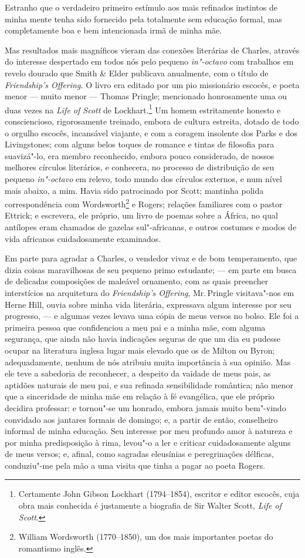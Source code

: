 Estranho que o verdadeiro primeiro estímulo aos mais refinados instintos
de minha mente tenha sido fornecido pela totalmente sem educação formal,
mas completamente boa e bem intencionada irmã de minha mãe.

Mas resultados mais magníficos vieram das conexões literárias de
Charles, através do interesse despertado em todos nós pelo pequeno
\textit{in"-octavo} com trabalhos em revelo dourado que Smith \& Elder
publicava anualmente, com o título de \textit{Friendship's Offering.} O
livro era editado por um pio missionário escocês, e poeta menor --- muito
menor --- Thomas Pringle; mencionado honrosamente uma ou duas vezes na
\textit{Life of Scott} de Lockhart.\footnote{Certamente John Gibson
  Lockhart (1794--1854), escritor e editor escocês, cuja obra mais
  conhecida é justamente a biografia de Sir Walter Scott, \textit{Life
  of Scott}.} Um homem estritamente honesto e
consciencioso, rigorosamente treinado, embora de cultura estreita,
dotado de todo o orgulho escocês, incansável viajante, e com a coragem
insolente dos Parks e dos Livingstones; com alguns belos toques de
romance e tintas de filosofia para suavizá"-lo, era membro reconhecido,
embora pouco considerado, de nossos melhores círculos literários, e
conhecera, no processo de distribuição de seu pequeno \textit{in"-octavo}
em relevo, todo mundo dos círculos externos, e num nível mais abaixo, a
mim. Havia sido patrocinado por Scott; mantinha polida correspondência
com Wordsworth\footnote{William Wordsworth (1770--1850), um dos mais
  importantes poetas do romantismo inglês.} e Rogers;
relações familiares com o pastor Ettrick; e escrevera, ele próprio, um
livro de poemas sobre a África, no qual antílopes eram chamados de
gazelas sul"-africanas, e outros costumes e modos de vida africanos
cuidadosamente examinados.

Em parte para agradar a Charles, o vendedor vivaz e de bom
temperamento, que dizia coisas maravilhosas de seu pequeno primo
estudante; --- em parte em busca de delicadas composições de maleável
ornamento, com as quais preencher interstícios na arquitetura do
\textit{Friendship's Offering}, Mr.\,Pringle visitava"-nos em Herne Hill,
ouvia sobre minha vida literária, expressava algum interesse por seu
progresso, --- e algumas vezes levava uma cópia de meus versos no bolso.
Ele foi a primeira pessoa que confidenciou a meu pai e a minha mãe, com
alguma segurança, que ainda não havia indicações seguras de que um dia
eu pudesse ocupar na literatura inglesa lugar mais elevado que os de
Milton ou Byron; adequadamente, nenhum de nós atribuiu muita
importância à sua opinião. Mas ele teve a sabedoria de reconhecer, a
despeito da vaidade de meus pais, as aptidões naturais de meu pai, e sua
refinada sensibilidade romântica; não menor que a sinceridade de minha
mãe em relação à fé evangélica, que ele próprio decidira professar: e
tornou"-se um honrado, embora jamais muito bem"-vindo convidado aos
jantares formais de domingo; e, a partir de então, conselheiro informal
de minha educação. Seu interesse por meu profundo amor à natureza e por
minha predisposição à rima, levou"-o a ler e criticar cuidadosamente
alguns de meus versos; e, afinal, como sagradas eleusínias e
peregrinações délficas, conduziu"-me pela mão a uma visita que tinha a
pagar ao poeta Rogers.

